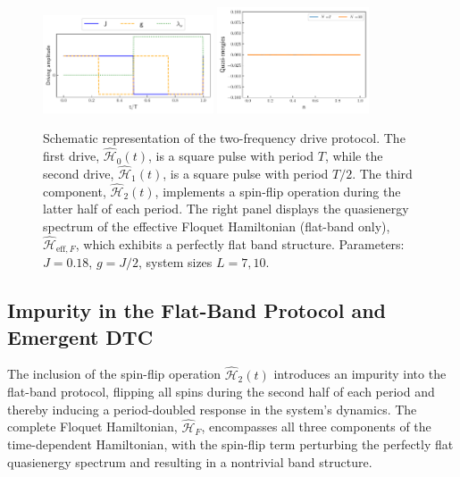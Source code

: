 \documentclass[a4paper, 10pt]{article}
\begin{document}
\begin{figure}[h!]
    \centering
    \includegraphics[width=0.45\textwidth]{figs/drive.pdf}
    \includegraphics[width=0.4\textwidth]{figs/pure_flatband.pdf}
    \caption{Schematic representation of the two-frequency drive protocol. The first drive, $\hat{\mathcal{H}}_0(t)$, is a square pulse with period $T$, while the second drive, $\hat{\mathcal{H}}_1(t)$, is a square pulse with period $T/2$. The third component, $\hat{\mathcal{H}}_2(t)$, implements a spin-flip operation during the latter half of each period. The right panel displays the quasienergy spectrum of the effective Floquet Hamiltonian (flat-band only), $\hat{\mathcal{H}}_{\text{eff},F}$, which exhibits a perfectly flat band structure. Parameters: $J=0.18$, $g=J/2$, system sizes $L=7, 10$.}
    \label{fig:drive}
\end{figure}

\subsection{Impurity in the Flat-Band Protocol and Emergent DTC}
The inclusion of the spin-flip operation $\hat{\mathcal{H}}_2(t)$ introduces an impurity into the flat-band protocol, flipping all spins during the second half of each period and thereby inducing a period-doubled response in the system's dynamics. The complete Floquet Hamiltonian, $\hat{\mathcal{H}}_F$, encompasses all three components of the time-dependent Hamiltonian, with the spin-flip term perturbing the perfectly flat quasienergy spectrum and resulting in a nontrivial band structure.
\end{document}
